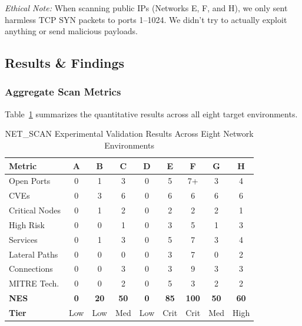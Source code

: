\documentclass[conference]{IEEEtran}
\begin{document}
\noindent\textit{Ethical Note:} When scanning public IPs (Networks E, F, and H), we only sent harmless TCP SYN packets to ports 1--1024. We didn't try to actually exploit anything or send malicious payloads.

\subsection{Results \& Findings}

\subsubsection{Aggregate Scan Metrics}
Table~\ref{tab:scan_metrics} summarizes the quantitative results across all eight target environments.

\begin{table}[htbp]
\caption{NET\_SCAN Experimental Validation Results Across Eight Network Environments}
\begin{center}
\begin{tabular}{|l|c|c|c|c|c|c|c|c|}
\hline
\textbf{Metric} & \textbf{A} & \textbf{B} & \textbf{C} & \textbf{D} & \textbf{E} & \textbf{F} & \textbf{G} & \textbf{H} \\
\hline
Open Ports & 0 & 1 & 3 & 0 & 5 & 7+ & 3 & 4 \\
\hline
CVEs & 0 & 3 & 6 & 0 & 6 & 6 & 6 & 6 \\
\hline
Critical Nodes & 0 & 1 & 2 & 0 & 2 & 2 & 2 & 1 \\
\hline
High Risk & 0 & 0 & 1 & 0 & 3 & 5 & 1 & 3 \\
\hline
Services & 0 & 1 & 3 & 0 & 5 & 7 & 3 & 4 \\
\hline
Lateral Paths & 0 & 0 & 0 & 0 & 3 & 7 & 0 & 2 \\
\hline
Connections & 0 & 0 & 3 & 0 & 3 & 9 & 3 & 3 \\
\hline
MITRE Tech. & 0 & 0 & 2 & 0 & 5 & 3 & 2 & 2 \\
\hline
\textbf{NES} & \textbf{0} & \textbf{20} & \textbf{50} & \textbf{0} & \textbf{85} & \textbf{100} & \textbf{50} & \textbf{60} \\
\hline
\textbf{Tier} & Low & Low & Med & Low & Crit & Crit & Med & High \\
\hline
\end{tabular}
\label{tab:scan_metrics}
\end{center}
\end{table}
\end{document}
